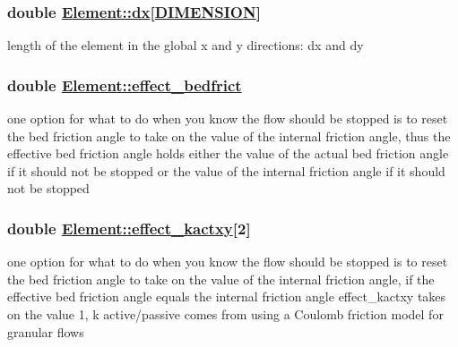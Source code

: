\hypertarget{classElement_r32}{
\subsubsection[dx]{\setlength{\rightskip}{0pt plus 5cm}double \hyperlink{classElement_r32}{Element::dx}\mbox{[}\hyperlink{constant_8h_a15}{DIMENSION}\mbox{]}}}
\label{classElement_r32}


length of the element in the global x and y directions: dx and dy 

\hypertarget{classElement_r44}{
\subsubsection[effect\_\-bedfrict]{\setlength{\rightskip}{0pt plus 5cm}double \hyperlink{classElement_r44}{Element::effect\_\-bedfrict}}}
\label{classElement_r44}


one option for what to do when you know the flow should be stopped is to reset the bed friction angle to take on the value of the internal friction angle, thus the effective bed friction angle holds either the value of the actual bed friction angle if it should not be stopped or the value of the internal friction angle if it should not be stopped 

\hypertarget{classElement_r46}{
\subsubsection[effect\_\-kactxy]{\setlength{\rightskip}{0pt plus 5cm}double \hyperlink{classElement_r46}{Element::effect\_\-kactxy}\mbox{[}2\mbox{]}}}
\label{classElement_r46}


one option for what to do when you know the flow should be stopped is to reset the bed friction angle to take on the value of the internal friction angle, if the effective bed friction angle equals the internal friction angle effect\_\-kactxy takes on the value 1, k active/passive comes from using a Coulomb friction model for granular flows 

